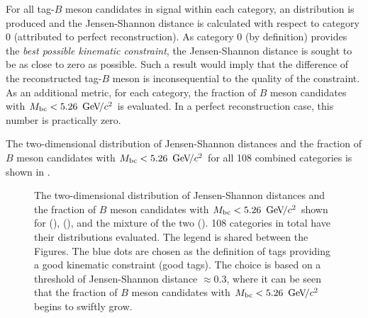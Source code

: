 For all tag-$B$ meson candidates in signal \MC within each category, an \Mbc distribution is produced 
and the Jensen-Shannon distance is calculated with respect to category 0 (attributed to perfect reconstruction).
As category 0 (by definition) provides the \textit{best possible kinematic constraint}, the Jensen-Shannon distance is sought to be as close to zero as possible.
Such a result would imply that the difference of the reconstructed tag-$B$ meson is inconsequential to the quality of the constraint.
As an additional metric, for each category, the fraction of $B$ meson candidates with ${M_{\mathrm{bc}}}<5.26~{\mathrm{\,Ge\kern -0.1em V\!/}c^2}$ is evaluated.
In a perfect reconstruction case, this number is practically zero.

The two-dimensional distribution of Jensen-Shannon distances and the fraction of $B$ meson candidates with ${M_{\mathrm{bc}}}<5.26~{\mathrm{\,Ge\kern -0.1em V\!/}c^2}$
for all 108 combined categories is shown in .
\begin{figure}[hbtp!]
    \centering
    \caption{\label{fig:good_tags_jsdists} The two-dimensional distribution of Jensen-Shannon distances and the fraction of $B$ meson candidates with ${M_{\mathrm{bc}}}<5.26~{\mathrm{\,Ge\kern -0.1em V\!/}c^2}$
    shown for \BptoXsgamma (), \BztoXsgamma (), and the mixture of the two ().
    108 categories in total have their \Mbc distributions evaluated.
    The legend is shared between the Figures.
    The blue dots are chosen as the definition of tags providing a good kinematic constraint (good tags).
    The choice is based on a threshold of Jensen-Shannon distance $\approx0.3$, where it can be seen that the fraction of $B$ meson candidates with ${M_{\mathrm{bc}}}<5.26~{\mathrm{\,Ge\kern -0.1em V\!/}c^2}$ begins to swiftly grow.
    }
\end{figure}
